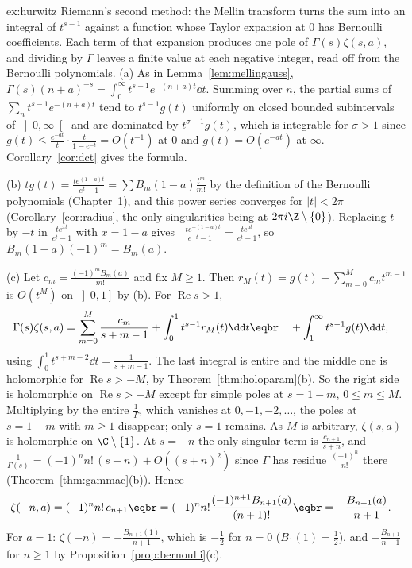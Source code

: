\begin{solution}{ex:hurwitz}
\idea Riemann's second method: the Mellin transform turns the sum into an integral of $t^{s-1}$ against a function whose Taylor
expansion at $0$ has Bernoulli coefficients. Each term of that expansion produces one pole of $\Gamma(s)\zeta(s,a)$, and dividing by $\Gamma$
leaves a finite value at each negative integer, read off from the Bernoulli polynomials.
\writeup (a) As in Lemma~\ref{lem:mellingauss}, $\Gamma(s)(n+a)^{-s}=\int_0^\infty t^{s-1}e^{-(n+a)t}\dd t$. Summing over $n$, the partial sums of $\sum_nt^{s-1}e^{-(n+a)t}$ tend to $t^{s-1}g(t)$
uniformly on closed bounded subintervals of $\left]0,\infty\right[$ and are dominated by $t^{\sigma-1}g(t)$, which is integrable for $\sigma>1$ since $g(t)\le\frac{e^{-at}}t\cdot\frac t{1-e^{-t}}=O(t^{-1})$
at $0$ and $g(t)=O(e^{-at})$ at $\infty$. Corollary~\ref{cor:dct} gives the formula.

(b) $tg(t)=\frac{te^{(1-a)t}}{e^t-1}=\sum B_m(1-a)\frac{t^m}{m!}$ by the definition of the Bernoulli polynomials (Chapter~1), and this power series converges for $|t|<2\pi$
(Corollary~\ref{cor:radius}, the only singularities being at $2\pi i\Z\setminus\{0\}$). Replacing $t$ by $-t$ in $\frac{te^{xt}}{e^t-1}$ with $x=1-a$ gives $\frac{-te^{-(1-a)t}}{e^{-t}-1}=\frac{te^{at}}{e^t-1}$,
so $B_m(1-a)(-1)^m=B_m(a)$.

(c) Let $c_m=\frac{(-1)^mB_m(a)}{m!}$ and fix $M\ge1$. Then $r_M(t)=g(t)-\sum_{m=0}^Mc_mt^{m-1}$ is $O(t^M)$ on $\left]0,1\right]$ by (b). For $\operatorname{Re}s>1$,
\[
\begin{aligned}\Gamma(s)\zeta(s,a)&=\sum_{m=0}^M\frac{c_m}{s+m-1}+\int_0^1t^{s-1}r_M(t)\dd t\eqbr\quad+\int_1^\infty t^{s-1}g(t)\dd t,\end{aligned}
\]
using $\int_0^1t^{s+m-2}\dd t=\frac1{s+m-1}$. The last integral is entire and the middle one is holomorphic for $\operatorname{Re}s>-M$, by Theorem~\ref{thm:holoparam}(b). So the right
side is holomorphic on $\operatorname{Re}s>-M$ except for simple poles at $s=1-m$, $0\le m\le M$. Multiplying by the entire $\frac1\Gamma$, which vanishes at $0,-1,-2,\dots$, the poles at
$s=1-m$ with $m\ge1$ disappear; only $s=1$ remains. As $M$ is arbitrary, $\zeta(s,a)$ is holomorphic on $\C\setminus\{1\}$. At $s=-n$ the only singular term is $\frac{c_{n+1}}{s+n}$,
and $\frac1{\Gamma(s)}=(-1)^nn!\,(s+n)+O((s+n)^2)$ since $\Gamma$ has residue $\frac{(-1)^n}{n!}$ there (Theorem~\ref{thm:gammac}(b)). Hence
\[
\begin{aligned}\zeta(-n,a)&=(-1)^nn!\,c_{n+1}\eqbr=(-1)^nn!\frac{(-1)^{n+1}B_{n+1}(a)}{(n+1)!}\eqbr=-\frac{B_{n+1}(a)}{n+1}.\end{aligned}
\]
For $a=1$: $\zeta(-n)=-\frac{B_{n+1}(1)}{n+1}$, which is $-\frac12$ for $n=0$ ($B_1(1)=\frac12$), and $-\frac{B_{n+1}}{n+1}$ for $n\ge1$ by Proposition~\ref{prop:bernoulli}(c).
\end{solution}

